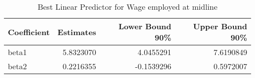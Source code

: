 \begin{table}

\caption{\label{tab:Rempl}Best Linear Predictor for Wage employed at midline}
\centering
\begin{tabular}[t]{lrrr}
\toprule
Coefficient & Estimates & Lower Bound 90\% & Upper Bound 90\%\\
\midrule
beta1 & 5.8323070 & 4.0455291 & 7.6190849\\
beta2 & 0.2216355 & -0.1539296 & 0.5972007\\
\bottomrule
\end{tabular}
\end{table}
